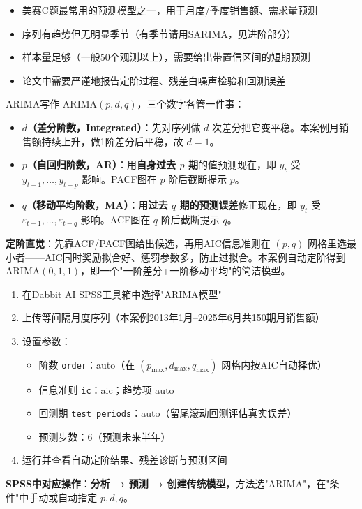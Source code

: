 \begin{algoscene}
\begin{itemize}
    \item 美赛C题最常用的预测模型之一，用于月度/季度销售额、需求量预测
    \item 序列有趋势但无明显季节（有季节请用SARIMA，见进阶部分）
    \item 样本量足够（一般50个观测以上），需要给出带置信区间的短期预测
    \item 论文中需要严谨地报告定阶过程、残差白噪声检验和回测误差
\end{itemize}
\end{algoscene}

\begin{algoprinciple}
ARIMA写作 $\mathrm{ARIMA}(p,d,q)$，三个数字各管一件事：

\begin{itemize}
    \item \textbf{$d$（差分阶数，Integrated）}：先对序列做 $d$ 次差分把它变平稳。本案例月销售额持续上升，做1阶差分后平稳，故 $d=1$。
    \item \textbf{$p$（自回归阶数，AR）}：用\textbf{自身过去 $p$ 期}的值预测现在，即 $y_t$ 受 $y_{t-1},\ldots,y_{t-p}$ 影响。PACF图在 $p$ 阶后截断提示 $p$。
    \item \textbf{$q$（移动平均阶数，MA）}：用\textbf{过去 $q$ 期的预测误差}修正现在，即 $y_t$ 受 $\varepsilon_{t-1},\ldots,\varepsilon_{t-q}$ 影响。ACF图在 $q$ 阶后截断提示 $q$。
\end{itemize}

\textbf{定阶直觉}：先靠ACF/PACF图给出候选，再用AIC信息准则在 $(p,q)$ 网格里选最小者——AIC同时奖励拟合好、惩罚参数多，防止过拟合。本案例自动定阶得到 $\mathrm{ARIMA}(0,1,1)$，即一个"一阶差分+一阶移动平均"的简洁模型。
\end{algoprinciple}

\begin{algosposs}
\begin{enumerate}
    \item 在Dabbit AI SPSS工具箱中选择"ARIMA模型"
    \item 上传等间隔月度序列（本案例2013年1月--2025年6月共150期月销售额）
    \item 设置参数：
    \begin{itemize}
        \item 阶数 \texttt{order}：auto（在 $(p_{\max},d_{\max},q_{\max})$ 网格内按AIC自动择优）
        \item 信息准则 \texttt{ic}：aic；趋势项 auto
        \item 回测期 \texttt{test periods}：auto（留尾滚动回测评估真实误差）
        \item 预测步数：6（预测未来半年）
    \end{itemize}
    \item 运行并查看自动定阶结果、残差诊断与预测区间
\end{enumerate}

\textbf{SPSS中对应操作}：\textbf{分析 → 预测 → 创建传统模型}，方法选"ARIMA"，在"条件"中手动或自动指定 $p,d,q$。
\end{algosposs}

